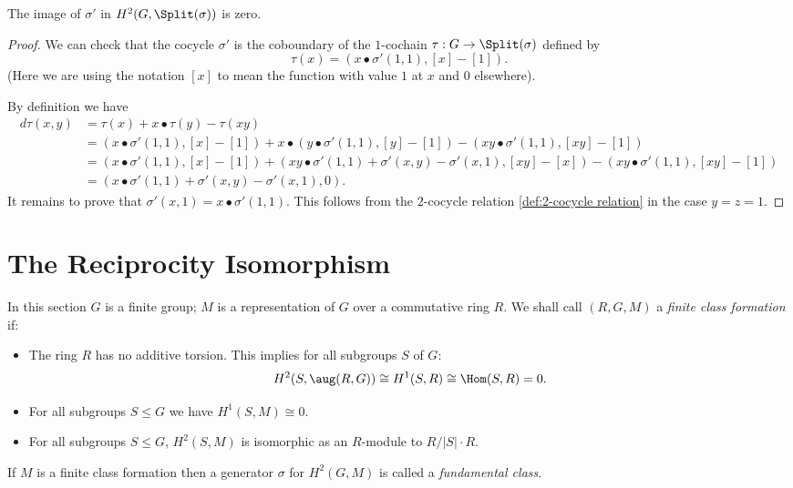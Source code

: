 \begin{lemma} \label{lem:splits in splitting module}
	The image of $\sigma'$ in $H^2(G,\Split(\sigma))$ is zero.
\end{lemma}

\begin{proof}
	We can check that the cocycle $\sigma'$ is the coboundary of
	the $1$-cochain $\tau : G \to \Split(\sigma)$ defined by
	\[
		\tau (x) = (x \bullet σ'(1,1), [x]-[1]).
	\]
	(Here we are using the notation $[x]$
	to mean the function with value $1$ at $x$ and $0$ elsewhere).

	By definition we have
	\begin{align*}
		d\tau (x,y)
		&= \tau(x) + x \bullet \tau(y) - \tau(xy) \\
		&= (x \bullet σ'(1,1), [x]-[1])
		+ x \bullet (y \bullet σ'(1,1), [y]-[1])
		-(xy \bullet σ'(1,1), [xy]-[1])\\
		&=
		(x \bullet σ'(1,1), [x]-[1])
		+ (xy \bullet σ'(1,1) + \sigma'(x,y) -\sigma'(x,1), [xy]-[x])
		- (xy \bullet σ'(1,1), [xy]-[1])\\
		&=
		(x \bullet \sigma'(1,1) + \sigma'(x,y) -\sigma'(x,1) , 0).
	\end{align*}
	It remains to prove that $\sigma'(x,1) = x \bullet \sigma'(1,1)$.
	This follows from the $2$-cocycle relation \ref{def:2-cocycle relation}	in the case $y=z=1$.
\end{proof}





\section{The Reciprocity Isomorphism}

\begin{definition} \label{def:fundamental class}
	In this section $G$ is a finite group; $M$ is a representation of $G$ over a commutative ring $R$.
	We shall call $(R,G,M)$ a \emph{finite class formation} if:
	\begin{itemize}
		\item
		The ring $R$ has no additive torsion. This implies for all subgroups $S$ of $G$:
		\[
			H^2(S,\aug(R,G)) \cong H^1(S,R) \cong \Hom(S,R) = 0.
		\]
		\item
		For all subgroups $S \le G$ we have $H^1(S,M) \cong 0$.
		\item
		For all subgroups $S \le G$, $H^2(S,M)$ is isomorphic as an $R$-module to $R / |S| \cdot R$.
	\end{itemize}
	If $M$ is a finite class formation then a generator $\sigma$ for $H^2(G,M)$ is called
	a \emph{fundamental class}.
\end{definition}

